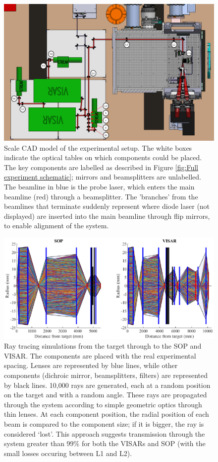 \begin{figure}
	\centering
	\includegraphics[width=1.0\textwidth]{figures/Experiment/OriginalCad.pdf}%
	\caption{\label{fig:Original CAD} Scale CAD model of the experimental setup. The white boxes indicate the optical tables on which components could be placed. The key components are labelled as described in Figure \ref{fig:Full experiment schematic}; mirrors and beamsplitters are unlabelled. The beamline in blue is the probe laser, which enters the main beamline (red) through a beamsplitter. The 'branches' from the beamlines that terminate suddenly represent where diode laser (not displayed) are inserted into the main beamline through flip mirrors, to enable alignment of the system.}
\end{figure}

\begin{figure}
	\centering
\includegraphics[width=1.0\textwidth]{figures/Experiment/RayTracing.eps}%
\caption{\label{fig:Ray trace} Ray tracing simulations from the target through to the SOP and VISAR. The components are placed with the real experimental spacing. Lenses are represented by blue lines, while other components (dichroic mirror, beamsplitters, filters) are represented by black lines. 10,000 rays are generated, each at a random position on the target and with a random angle. These rays are propagated through the system according to simple geometric optics through thin lenses. At each component position, the radial position of each beam is compared to the component size; if it is bigger, the ray is considered `lost'. This approach suggests transmission through the system greater than 99\% for both the VISARs and SOP (with the small losses occuring between L1 and L2).}
\end{figure}

